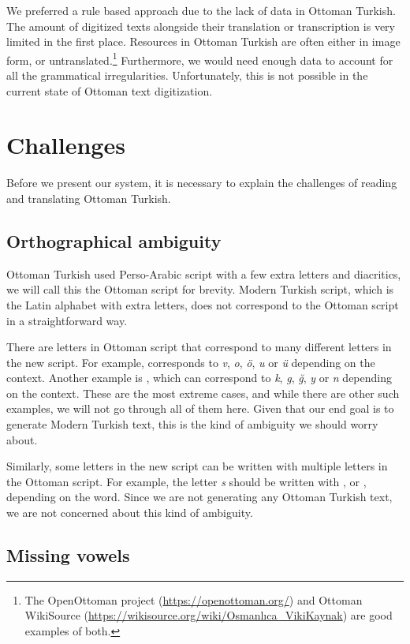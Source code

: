 \documentclass[10pt,twocolumn]{article}
\theoremstyle{nonumberplain}
\newcommand{\otto}[1]{\RLE{\ottoman{}\Large{}#1}}
\begin{document}
We preferred a rule based approach due to the lack of data in Ottoman
Turkish. The amount of digitized texts alongside their translation or
transcription is very limited in the first place.
Resources in Ottoman Turkish are often either in image form, or
untranslated.\footnote{The OpenOttoman project (\url{https://openottoman.org/})
and Ottoman WikiSource (\url{https://wikisource.org/wiki/Osmanlıca_VikiKaynak})
are good examples of both.}
Furthermore, we would need enough data to account for all the grammatical
irregularities. Unfortunately, this is not possible in the current state of
Ottoman text digitization.

\section{Challenges}

Before we present our system, it is necessary to explain the challenges of reading and translating Ottoman Turkish.

\subsection{Orthographical ambiguity}

Ottoman Turkish used Perso-Arabic script with a few extra letters and
diacritics, we will call this the Ottoman script for brevity. Modern Turkish
script, which is the Latin alphabet with extra letters, does not correspond to
the Ottoman script in a straightforward way.

There are letters in Ottoman script that correspond to many different letters in the new script.
For example, \otto{و} corresponds to \emph{v}, \emph{o}, \emph{ö}, \emph{u} or \emph{ü} depending on the context.
Another example is \otto{ك}, which can correspond to \emph{k}, \emph{g}, \emph{ğ}, \emph{y} or \emph{n} depending on the context.
These are the most extreme cases, and while there are other such examples, we
will not go through all of them here.  Given that our end goal is to generate
Modern Turkish text, this is the kind of ambiguity we should worry about.

Similarly, some letters in the new script can be written with multiple letters
in the Ottoman script. For example, the letter \emph{s} should be written with
\otto{س}, \otto{ص} or \otto{ث}, depending on the word. Since we are not
generating any Ottoman Turkish text, we are not concerned about this kind of
ambiguity.

\subsection{Missing vowels}
\label{missing-vowels}
\end{document}

